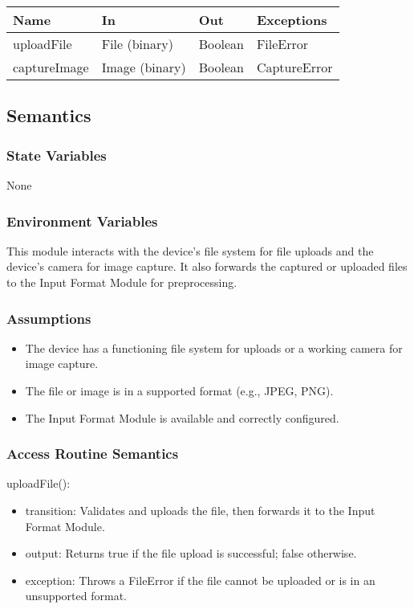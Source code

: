 \documentclass[12pt, titlepage]{article}
\begin{document}
\begin{center}
\begin{tabular}{p{4cm} p{4cm} p{4cm} p{4cm}}
\hline
\textbf{Name} & \textbf{In} & \textbf{Out} & \textbf{Exceptions} \\
\hline
uploadFile & File (binary) & Boolean & FileError \\
captureImage & Image (binary) & Boolean & CaptureError \\
\hline
\end{tabular}
\end{center}

\subsection{Semantics}

\subsubsection{State Variables}

None

\subsubsection{Environment Variables}

This module interacts with the device's file system for file uploads and the device's camera for image capture. It also forwards the captured or uploaded files to the Input Format Module for preprocessing.

\subsubsection{Assumptions}

\begin{itemize}
    \item The device has a functioning file system for uploads or a working camera for image capture.
    \item The file or image is in a supported format (e.g., JPEG, PNG).
    \item The Input Format Module is available and correctly configured.
\end{itemize}

\subsubsection{Access Routine Semantics}

\noindent uploadFile():
\begin{itemize}
    \item transition: Validates and uploads the file, then forwards it to the Input Format Module.
    \item output: Returns true if the file upload is successful; false otherwise.
    \item exception: Throws a FileError if the file cannot be uploaded or is in an unsupported format.
\end{itemize}
\end{document}
